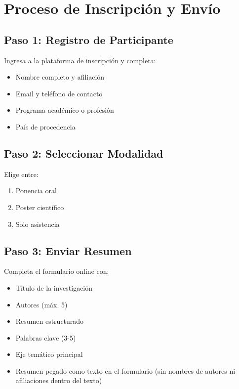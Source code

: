 \documentclass[12pt,a4paper]{article}
\begin{document}
\section{Proceso de Inscripción y Envío}

\subsection{Paso 1: Registro de Participante}

Ingresa a la plataforma de inscripción y completa:
\begin{itemize}[label={\textcolor{verdeosc}{\textbullet}}]
  \item Nombre completo y afiliación
  \item Email y teléfono de contacto
  \item Programa académico o profesión
  \item País de procedencia
\end{itemize}

\subsection{Paso 2: Seleccionar Modalidad}

Elige entre:
\begin{enumerate}[label={\textcolor{verdemid}{\arabic{*}.}}]
  \item Ponencia oral
  \item Poster científico
  \item Solo asistencia
\end{enumerate}

\subsection{Paso 3: Enviar Resumen}

Completa el formulario online con:
\begin{itemize}[label={\textcolor{verdeosc}{\textbullet}}]
  \item Título de la investigación
  \item Autores (máx. 5)
  \item Resumen estructurado
  \item Palabras clave (3-5)
  \item Eje temático principal
  \item Resumen pegado como texto en el formulario (sin nombres de autores ni afiliaciones dentro del texto)
\end{itemize}
\end{document}
